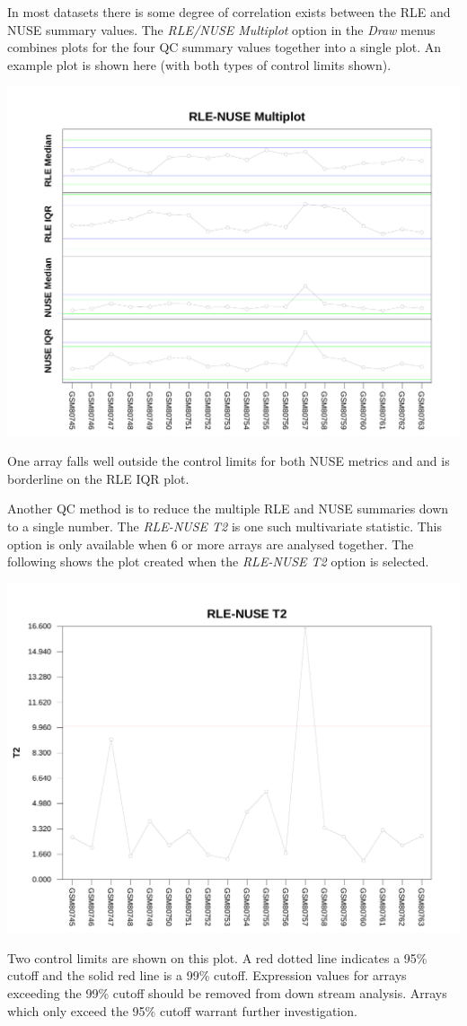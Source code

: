 \documentclass[11pt]{report}
\begin{document}
In most datasets there is some degree of correlation exists between the RLE and NUSE summary values. The {\it RLE/NUSE Multiplot} option in the {\it Draw} menus combines plots for the four QC summary values together into a single plot. An example plot is shown here (with both types of control limits shown).
\begin{center}
\includegraphics[scale=0.4]{RLENUSEMultiplot_New.pdf}
\end{center}
One array falls well outside the control limits for both NUSE metrics and and is borderline on the RLE IQR plot.

Another QC method is to reduce the multiple RLE and NUSE summaries down to a single number. The {\it RLE-NUSE T2} is one such multivariate statistic. This option is only available when 6 or more arrays are analysed together. The following shows the plot created when the {\it RLE-NUSE T2} option is selected.
\begin{center}
\includegraphics[scale=0.4]{RLE_NUSE_T2.pdf}
\end{center}
Two control limits are shown on this plot. A red dotted line indicates a 95\% cutoff and the solid red line is a 99\% cutoff. Expression values for arrays exceeding the 99\% cutoff should be removed from down stream analysis. Arrays which only exceed the 95\% cutoff warrant further investigation.
\end{document}
